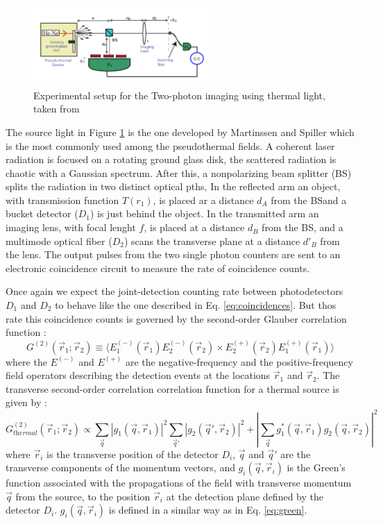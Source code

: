 \begin{figure}[h!]
\centering
\includegraphics[width=0.6\textwidth]{Figures/thermalSetup.png}
\caption{Experimental setup for the Two-photon imaging using thermal light, taken from \cite{thermalAlejandra}} 
\label{fig:thermalSetup}
\end{figure}
The source light in Figure \ref{fig:thermalSetup} is the one developed by Martinssen and Spiller\cite{intensity}
which is the most commonly used among the pseudothermal fields. A  coherent laser radiation is focused on a rotating ground glass disk, 
the scattered radiation is chaotic with a Gaussian spectrum. After this, a nonpolarizing beam
splitter (BS) splits the radiation in two distinct optical pths, In the reflected arm an object, with 
transmission function $T(r_1)$, is placed ar a distance $d_A$ from the BSand a bucket detector ($D_1$)
is just behind the object. In the transmitted arm an imaging lens, with focal lenght $f$, is placed at a 
distance $d_B$ from the BS, and a multimode optical fiber ($D_2$) scans the transverse plane
at a distance $d'_B$ from the lens. The output pulses from the two single photon counters are sent 
to an electronic coincidence circuit to measure the rate of coincidence counts.

Once again we expect the joint-detection counting rate between photodetectors $D_1$ and $D_2$ to behave
like the one described in Eq. \ref{eq:coincidences}. But thos rate this coincidence counts is governed
by the second-order Glauber correlation function \cite{glauber}:
\begin{equation}
G^{(2)} (\vec{r}_1; \vec{r}_2) \equiv \langle E^{(-)}_1(\vec{r}_1)E^{(-)}_2(\vec{r}_2) \times E^{(+)}_2(\vec{r}_2)E^{(+)}_1(\vec{r}_1) \rangle
\end{equation}
where the $E^{(-)}$ and $E^{(+)}$ are the negative-frequency and the positive-frequency field operators describing the detection events at the
locations $\vec{r}_1$ and $\vec{r}_2$. The transverse second-order correlation correlation function 
for a thermal source is given by \cite{thermalAlejandra}:
\begin{equation}\label{eq:thermal}
G^{(2)}_{\textit{thermal}}(\vec{r}_1; \vec{r}_2) \propto \sum_{\vec{q}} |g_1(\vec{q},\vec{r}_1)|^2
\sum_{\vec{q}'} |g_2(\vec{q}',\vec{r}_2)|^2 + |\sum_{\vec{q}} g_1^*(\vec{q},\vec{r}_1) g_2(\vec{q},\vec{r}_2)|^2
\end{equation}
where $\vec{r}_i$ is the transverse position of the detector $D_i$, $\vec{q}$ and $\vec{q}'$
are the transverse components of the momentum vectors, and $g_i(\vec{q},\vec{r}_i)$ is the Green's function 
associated with the propagations of the field with transverse momentum $\vec{q}$ from the source, 
to the position $\vec{r}_i$ at the detection plane defined by the detector $D_i$. $g_i(\vec{q},\vec{r}_i)$ is defined in a similar way 
as in Eq. \ref{eq:green}.

